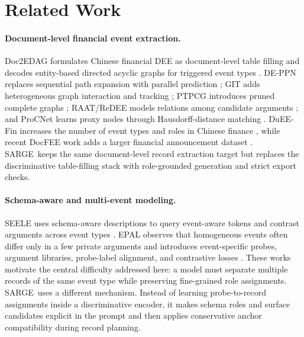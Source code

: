 \documentclass[11pt]{article}
\newcommand{\method}{SARGE}
\begin{document}
\section{Related Work}

\paragraph{Document-level financial event extraction.}
Doc2EDAG formulates Chinese financial DEE as document-level table filling and decodes entity-based directed acyclic graphs for triggered event types \citep{zheng2019doc2edag}. DE-PPN replaces sequential path expansion with parallel prediction \citep{yang2021ppn}; GIT adds heterogeneous graph interaction and tracking \citep{xu2021git}; PTPCG introduces pruned complete graphs \citep{zhu2022ptpcg}; RAAT/ReDEE models relations among candidate arguments \citep{liang2022raat}; and ProCNet learns proxy nodes through Hausdorff-distance matching \citep{wang2023procnet}. DuEE-Fin increases the number of event types and roles in Chinese finance \citep{han2022dueefin}, while recent DocFEE work adds a larger financial announcement dataset \citep{chen2025docfee}. \method\ keeps the same document-level record extraction target but replaces the discriminative table-filling stack with role-grounded generation and strict export checks.

\paragraph{Schema-aware and multi-event modeling.}
SEELE uses schema-aware descriptions to query event-aware tokens and contrast arguments across event types \citep{xu2024seele}. EPAL observes that homogeneous events often differ only in a few private arguments and introduces event-specific probes, argument libraries, probe-label alignment, and contrastive losses \citep{hu2025epal}. These works motivate the central difficulty addressed here: a model must separate multiple records of the same event type while preserving fine-grained role assignments. \method\ uses a different mechanism. Instead of learning probe-to-record assignments inside a discriminative encoder, it makes schema roles and surface candidates explicit in the prompt and then applies conservative anchor compatibility during record planning.
\end{document}
